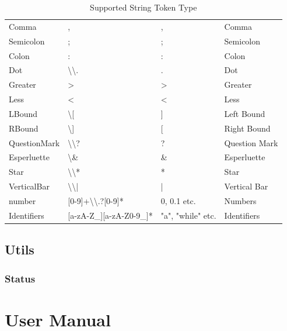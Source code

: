 \documentclass{article}
\begin{document}
\begin{table}[hb!]
\begin{tabular}{l|lll}
			Comma        & ,                                                      & ,                 & Comma          \\
			Semicolon    & ;                                                      & ;                 & Semicolon      \\
			Colon        & :                                                      & :                 & Colon          \\
			Dot          & \textbackslash{}\textbackslash{}.                      & .                 & Dot            \\
			Greater      & \textgreater{}                                         & \textgreater{}    & Greater        \\
			Less         & \textless{}                                            & \textless{}       & Less           \\
			LBound       & \textbackslash{}[                                     & {]}               & Left Bound     \\
			RBound       & \textbackslash{}]                                     & {[}               & Right Bound    \\
			QuestionMark & \textbackslash{}\textbackslash{}?                      & ?                 & Question Mark  \\
			Esperluette  & \textbackslash{}\&                                     & \&                & Esperluette    \\
			Star         & \textbackslash{}\textbackslash{}*                      & *                 & Star           \\
			VerticalBar  & \textbackslash{}\textbackslash{}|                      & |                 & Vertical Bar   \\
			number       & {[}0-9{]}+\textbackslash{}\textbackslash{}.?{[}0-9{]}* & 0, 0.1 etc.       & Numbers        \\
			Identifiers  & {[}a-zA-Z\_{]}{[}a-zA-Z0-9\_{]}*                       & "a", "while" etc. & Identifiers    \\ \hline
		\end{tabular}
		\caption{Supported String Token Type}
		\label{tab:supported_lexical_token_list}
	\end{table}
	\subsection{Utils}\label{subsec:utils}

	\subsubsection{Status }
	\section{User Manual}\label{sec:user-manual}

	\printindex
\end{document}
